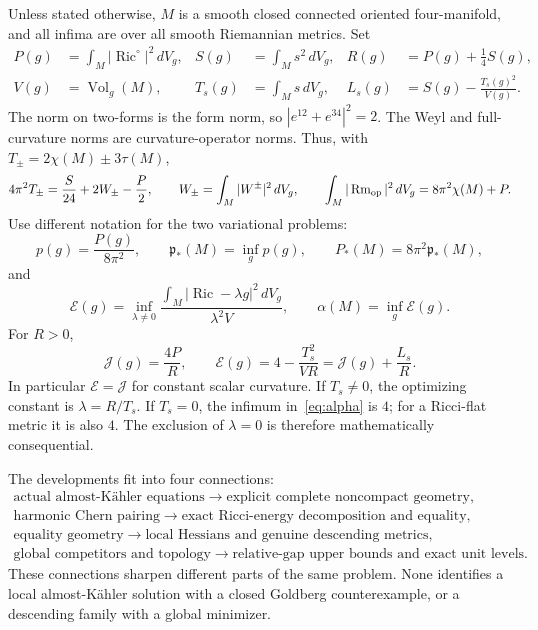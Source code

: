 \documentclass[11pt]{article}
\newcommand{\Ric}{\operatorname{Ric}}
\newcommand{\Rm}{\operatorname{Rm}}
\newcommand{\Vol}{\operatorname{Vol}}
\newcommand{\dd}{\,dV_g}
\newcommand{\cE}{\mathcal E}
\newcommand{\cJ}{\mathcal J}
\newcommand{\pstar}{\mathfrak p_*}
\theoremstyle{definition}
\theoremstyle{remark}
\begin{document}
Unless stated otherwise, $M$ is a smooth closed connected oriented
four-manifold, and all infima are over all smooth Riemannian metrics.
Set
\begin{align}
 P(g)&=\int_M|\Ric^\circ|^2\dd,&
 S(g)&=\int_Ms^2\dd,&
 R(g)&=P(g)+\frac14S(g),\label{eq:energies}\\
 V(g)&=\Vol_g(M),& T_s(g)&=\int_Ms\dd,&
 L_s(g)&=S(g)-\frac{T_s(g)^2}{V(g)}.
\end{align}
The norm on two-forms is the form norm, so
$|e^{12}+e^{34}|^2=2$. The Weyl and full-curvature norms are curvature-operator
norms. Thus, with $T_\pm=2\chi(M)\pm3\tau(M)$,
\begin{equation}
 4\pi^2T_\pm=\frac{S}{24}+2W_\pm-\frac P2,
 \qquad W_\pm=\int_M|W^\pm|^2\dd,
 \qquad \int_M|\Rm_{\rm op}|^2\dd=8\pi^2\chi(M)+P.
 \label{eq:cw}
\end{equation}
Use different notation for the two variational problems:
\begin{equation}
 p(g)=\frac{P(g)}{8\pi^2},\qquad
 \pstar(M)=\inf_g p(g),\qquad
 P_*(M)=8\pi^2\pstar(M),
 \label{eq:pstar}
\end{equation}
and
\begin{equation}
 \cE(g)=\inf_{\lambda\ne0}
 \frac{\int_M|\Ric-\lambda g|^2\dd}{\lambda^2 V},
 \qquad \alpha(M)=\inf_g\cE(g).
 \label{eq:alpha}
\end{equation}
For $R>0$,
\begin{equation}
 \cJ(g)=\frac{4P}{R},\qquad
 \cE(g)=4-\frac{T_s^2}{VR}
        =\cJ(g)+\frac{L_s}{R}.
 \label{eq:EJ}
\end{equation}
In particular $\cE=\cJ$ for constant scalar curvature. If $T_s\ne0$,
the optimizing constant is $\lambda=R/T_s$. If $T_s=0$, the infimum
in~\eqref{eq:alpha} is $4$; for a Ricci-flat metric it is also $4$.
The exclusion of $\lambda=0$ is therefore mathematically consequential.

The developments fit into four connections:
\[
\begin{array}{c}
 \text{actual almost-K\"ahler equations}
 \longrightarrow \text{explicit complete noncompact geometry},\\[2pt]
 \text{harmonic Chern pairing}
 \longrightarrow \text{exact Ricci-energy decomposition and equality},\\[2pt]
 \text{equality geometry}
 \longrightarrow \text{local Hessians and genuine descending metrics},\\[2pt]
 \text{global competitors and topology}
 \longrightarrow \text{relative-gap upper bounds and exact unit levels}.
\end{array}
\]
These connections sharpen different parts of the same problem. None
identifies a local almost-K\"ahler solution with a closed Goldberg
counterexample, or a descending family with a global minimizer.
\end{document}
